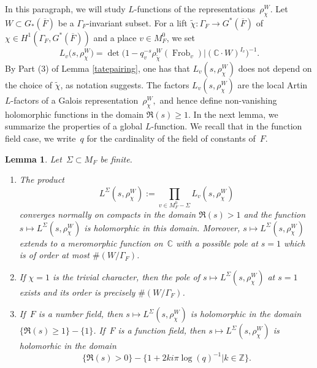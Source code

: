 \documentclass[a4paper,english,12pt]{amsart}
\newcommand{\CC}{\mathbb{C}}
\newcommand{\oF}{\overline F}
\newcommand{\ZZ}{\mathbb{Z}}
\newcommand{\wchi}{\widetilde{\chi}}
\DeclareMathOperator{\Frob}{Frob}
\newtheorem{lem}[equation]{Lemma}
\numberwithin{equation}{subsection}
\begin{document}
\subsubsection{}In this paragraph, we will study $L$-functions of the representations~$\rho^W_{\chi}$.  Let $W\subset G_*(\oF)$ be a $\Gamma_F$-invariant subset. For a lift $\wchi:\Gamma_F\to G^*(\oF)$ of $\chi\in H^1(\Gamma_F, G^*(\oF))$ and a place $v\in M_F^0$, we set $$L_v\big(s,\rho_{\chi}^{W}\big)=\det\big(1-q_v^{-s}\rho_{\wchi}^{W}(\Frob_v)|(\CC\cdot W)^{I_v}\big)^{-1}.$$ %
By Part (3) of Lemma \ref{tatepairing}, one has that $L_v(s, \rho^W_{\chi})$ does not depend on the choice of $\widetilde\chi$, as notation suggests.  The factors $L_v(s,\rho_{\chi}^W)$ are the local Artin $L$-factors of a Galois representation~$\rho^W_{\chi},$ and hence define non-vanishing holomorphic functions in the domain $\Re(s)\geq 1$. In the next lemma, we summarize the properties of a global $L$-function. We recall that in the function field case, we write~$q$ for the cardinality of the field of constants of~$F$.
\begin{lem}\label{lfunf}
Let~$\Sigma\subset M_F$ be finite. 
\begin{enumerate}
\item The product $$L^{\Sigma}(s,\rho_{\chi}^W):=\prod_{v\in M_F^0-\Sigma}L_v(s,\rho_{\chi}^{W})$$ converges normally on compacts in the domain $\Re(s)>1$ and the function $s\mapsto L^\Sigma(s,\rho^W_{\chi})$ is holomorphic in this domain. Moreover, $s\mapsto L^\Sigma(s,\rho^W_{\chi})$ extends to a meromorphic function on~$\CC$ with a possible pole at $s=1$ which is of order at most $\#(W/\Gamma_F)$.
\item If $\chi=1$ is the trivial character, then the pole of $s\mapsto L^{\Sigma}(s,\rho_{\chi}^W)$ at $s=1$ exists and its order is precisely $\#(W/\Gamma_F)$. 
\item If~$F$ is a number field, then $s\mapsto L^\Sigma(s,\rho^W_{\chi})$ is holomorphic in the domain $\{\Re(s)\geq 1\}-\{1\}$. If~$F$ is a function field, then $s\mapsto L^{\Sigma}(s, \rho^W_{\chi})$ is holomorhic in the domain $$\{\Re(s)>0\}-\{1+2ki\pi\log(q)^{-1}|k\in\ZZ\}.$$
\end{enumerate}
\end{lem}
\end{document}

